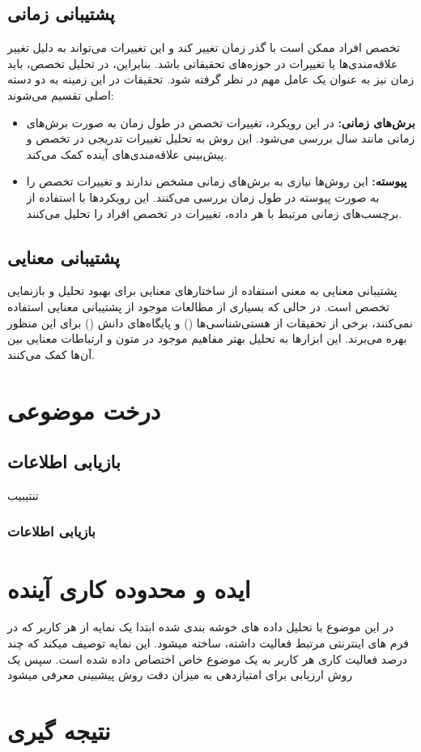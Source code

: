 \subsection*{پشتیبانی زمانی} تخصص افراد ممکن است با گذر زمان تغییر کند و این تغییرات می‌تواند به دلیل تغییر علاقه‌مندی‌ها یا تغییرات در حوزه‌های تحقیقاتی باشد. بنابراین، در تحلیل تخصص، باید زمان نیز به عنوان یک عامل مهم در نظر گرفته شود. تحقیقات در این زمینه به دو دسته اصلی تقسیم می‌شوند: \begin{itemize} \item \textbf{برش‌های زمانی:} در این رویکرد، تغییرات تخصص در طول زمان به صورت برش‌های زمانی مانند سال بررسی می‌شود. این روش به تحلیل تغییرات تدریجی در تخصص و پیش‌بینی علاقه‌مندی‌های آینده کمک می‌کند. \item \textbf{پیوسته:} این روش‌ها نیازی به برش‌های زمانی مشخص ندارند و تغییرات تخصص را به صورت پیوسته در طول زمان بررسی می‌کنند. این رویکردها با استفاده از برچسب‌های زمانی مرتبط با هر داده، تغییرات در تخصص افراد را تحلیل می‌کنند. \end{itemize}

\subsection*{پشتیبانی معنایی} پشتیبانی معنایی به معنی استفاده از ساختارهای معنایی برای بهبود تحلیل و بازنمایی تخصص است. در حالی که بسیاری از مطالعات موجود از پشتیبانی معنایی استفاده نمی‌کنند، برخی از تحقیقات از هستی‌شناسی‌ها () و پایگاه‌های دانش () برای این منظور بهره می‌برند. این ابزارها به تحلیل بهتر مفاهیم موجود در متون و ارتباطات معنایی بین آن‌ها کمک می‌کنند.

\section*{درخت موضوعی}
\subsection*{بازیابی اطلاعات}
تنتیبیب
\subsubsection*{بازیابی اطلاعات}


\section*{ایده و محدوده کاری آینده}
در این موضوع با تحلیل داده های خوشه بندی شده ابتدا یک نمایه از هر کاربر که در فرم های اینترنتی مرتبط فعالیت داشته، ساخته میشود.
این نمایه توصیف میکند که چند درصد فعالیت کاری هر کاربر به یک موضوع خاص اختصاص داده شده است.
سپس یک روش ارزیابی برای امتیازدهی به میزان دقت روش پیشبینی معرفی میشود
\section*{نتیجه گیری}